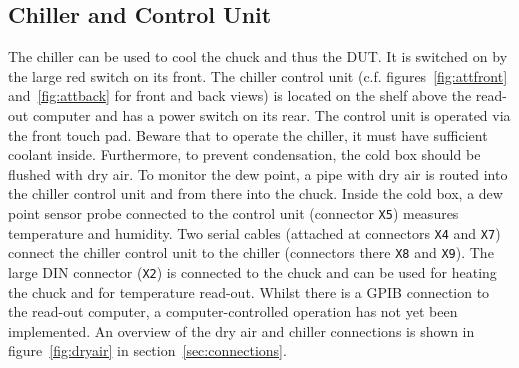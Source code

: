 \documentclass[a4paper]{article}
\begin{document}
\subsection{Chiller and Control Unit}
\label{sec:chiller}

The chiller can be used to cool the chuck and thus the DUT.
It is switched on by the large red switch on its front.
The chiller control unit (c.f. figures~\ref{fig:attfront} and~\ref{fig:attback} for front and back views) is located on the shelf above the read-out computer and has a power switch on its rear.
The control unit is operated via the front touch pad.
Beware that to operate the chiller, it must have sufficient coolant inside.
Furthermore, to prevent condensation, the cold box should be flushed with dry air.
To monitor the dew point, a pipe with dry air is routed into the chiller control unit and from there into the chuck.
Inside the cold box, a dew point sensor probe connected to the control unit (connector {\tt X5}) measures temperature and humidity.
Two serial cables (attached at connectors {\tt X4} and {\tt X7}) connect the chiller control unit to the chiller (connectors there {\tt X8} and {\tt X9}).
The large DIN connector ({\tt X2}) is connected to the chuck and can be used for heating the chuck and for temperature read-out.
Whilst there is a GPIB connection to the read-out computer, a computer-controlled operation has not yet been implemented.
An overview of the dry air and chiller connections is shown in figure~\ref{fig:dryair} in section~\ref{sec:connections}.\\
\end{document}
